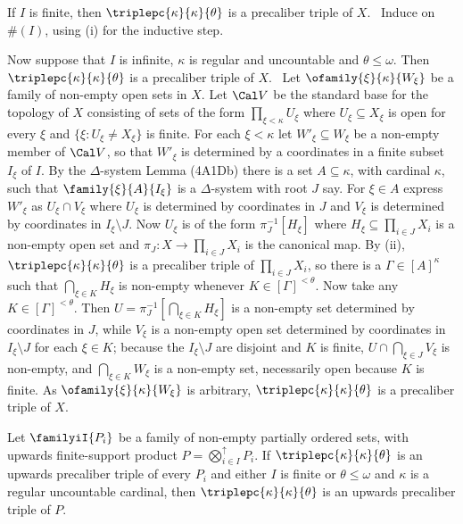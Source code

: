{\medskip

 If $I$ is finite, then
$\triplepc{\kappa}{\kappa}{\theta}$ is a precaliber triple of $X$.
\Prf\ Induce on $\#(I)$, using (i) for the inductive step.\ \Qed

\medskip

 Now suppose that $I$ is infinite, $\kappa$ is regular
and uncountable and $\theta\le\omega$.   Then
$\triplepc{\kappa}{\kappa}{\theta}$ is a precaliber triple of $X$.
\Prf\ Let
$\ofamily{\xi}{\kappa}{W_{\xi}}$ be a family of non-empty open sets in
$X$.   Let $\Cal V$ be the standard base for the topology of $X$
consisting of sets of the form $\prod_{\xi<\kappa}U_{\xi}$ where
$U_{\xi}\subseteq X_{\xi}$ is open for every $\xi$ and
$\{\xi:U_{\xi}\ne X_{\xi}\}$ is finite.   For each $\xi<\kappa$ let
$W'_{\xi}\subseteq W_{\xi}$ be a non-empty member of $\Cal V$, so that
$W'_{\xi}$ is determined by a coordinates in a finite subset $I_{\xi}$
of $I$.   By the $\Delta$-system Lemma (4A1Db) there is a set
$A\subseteq\kappa$, with cardinal $\kappa$, such that
$\family{\xi}{A}{I_{\xi}}$ is a $\Delta$-system with root $J$ say.
For $\xi\in A$ express $W'_{\xi}$ as $U_{\xi}\cap V_{\xi}$ where
$U_{\xi}$ is determined by coordinates in $J$ and $V_{\xi}$ is
determined by coordinates in $I_{\xi}\setminus J$.   Now $U_{\xi}$ is of
the form $\pi_J^{-1}[H_{\xi}]$ where $H_{\xi}\subseteq\prod_{i\in J}X_i$
is a non-empty open set and $\pi_J:X\to\prod_{i\in J}X_i$ is the
canonical map.   By (ii), $\triplepc{\kappa}{\kappa}{\theta}$ is a
precaliber triple of $\prod_{i\in J}X_i$, so there is a
$\Gamma\in[A]^{\kappa}$ such that $\bigcap_{\xi\in K}H_{\xi}$ is
non-empty whenever $K\in[\Gamma]^{<\theta}$.    Now take any
$K\in[\Gamma]^{<\theta}$.   Then
$U=\pi_J^{-1}[\bigcap_{\xi\in K}H_{\xi}]$ is a non-empty
set determined by coordinates in $J$, while $V_{\xi}$ is a non-empty
open set determined by coordinates in $I_{\xi}\setminus J$ for each
$\xi\in K$;  because the $I_{\xi}\setminus J$ are disjoint and $K$ is
finite, $U\cap\bigcap_{\xi\in J}V_{\xi}$ is non-empty, and
$\bigcap_{\xi\in K}W_{\xi}$ is a non-empty set, necessarily open because
$K$ is finite.   As
$\ofamily{\xi}{\kappa}{W_{\xi}}$ is arbitrary,
$\triplepc{\kappa}{\kappa}{\theta}$ is a precaliber triple of $X$.\
\Qed
}%

 Let $\familyiI{P_i}$ be a family of non-empty
partially ordered sets, with upwards finite-support product
$P=\bigotimes^{\uparrow}_{i\in I}P_i$.
If $\triplepc{\kappa}{\kappa}{\theta}$ is an upwards precaliber
triple of every $P_i$ and either $I$ is finite or $\theta\le\omega$ and
$\kappa$ is a regular uncountable cardinal, then
$\triplepc{\kappa}{\kappa}{\theta}$ is an upwards precaliber triple of
$P$.

